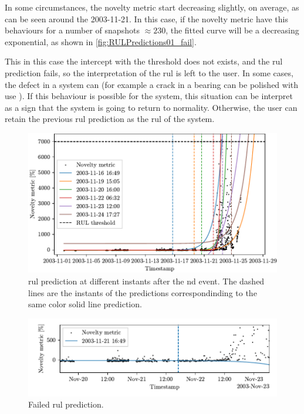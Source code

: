 In some circumstances, the novelty metric start decreasing slightly, on average, as can be seen around the 2003-11-21. In this case, if the novelty metric have this behaviours for a number of snapshots $\approx 230$, the fitted curve will be a decreasing exponential, as shown in \autoref{fig:RULPredictions01_fail}. 

This in this case the intercept with the threshold does not exists, and the \gls{rul} prediction fails, so the interpretation of the \gls{rul} is left to the user. In some cases, the defect in a system can  (for example a crack in a bearing can be polished with use \cite{IMSpaper}). If this behaviour is possible for the system, this situation can be interpret as a sign that the system is going to return to normality. Otherwise, the user can retain the previous \gls{rul} prediction as the \gls{rul} of the system.

\begin{figure}
    \includegraphics{images/IMS/Novelty_01_500samples_bearing3x_predictions.pdf}
    \caption{\gls{rul} prediction at different instants after the \gls{nd} event. The dashed lines are the instants of the predictions correspondinding to the same color solid line prediction.}
    \label{fig:RULPredictions01}
\end{figure}

\begin{figure}
    \includegraphics{images/IMS/Novelty_01_500samples_bearing3x_predictions_failed.pdf}
    \caption{Failed \gls{rul} prediction.}
    \label{fig:RULPredictions01_fail}
\end{figure}


